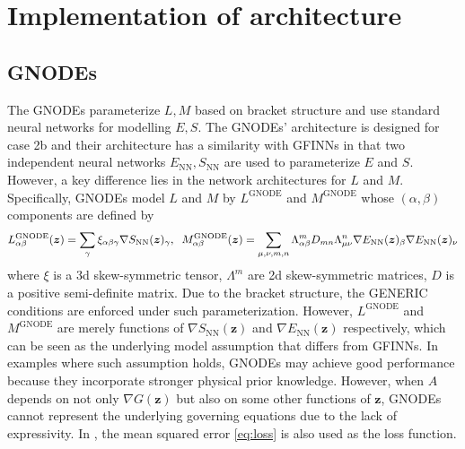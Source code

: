 \documentclass[openacc]{rsproca_new}%
\newcommand{\z}{\bm{z}}
\begin{document}
\appendix
\section{Implementation of architecture} \label{sec:implementation}
\subsection{GNODEs}
The GNODEs \cite{lee2021machine} parameterize $L,M$ 
based on bracket structure and use standard neural networks for modelling $E, S$.
The GNODEs' architecture is designed for case 2b
and their architecture has a similarity with GFINNs in that 
two independent neural networks $E_{\text{NN}}, S_\text{NN}$ are used to parameterize $E$ and $S$.
However, a key difference lies in 
the network architectures for $L$ and $M$.
Specifically, GNODEs model $L$ and $M$ by
$L^{\text{GNODE}}$ and $M^{\text{GNODE}}$
whose $(\alpha,\beta)$ components are defined by
\begin{equation*}
    L_{\alpha\beta}^{\text{GNODE}}(\z) = \sum_{\gamma}\xi_{\alpha\beta\gamma}\nabla S_\text{NN}(\z)_{\gamma}, \hspace{0.2cm}
    M_{\alpha\beta}^{\text{GNODE}}(\z) =\sum_{\mu,\nu,m,n}\Lambda_{\alpha\beta}^mD_{mn}\Lambda_{\mu\nu}^n\nabla E_\text{NN}(\z)_{\beta}\nabla E_\text{NN}(\z)_{\nu}
\end{equation*}
where $\xi$ is a 3d skew-symmetric tensor, $\Lambda^m$ are 2d skew-symmetric matrices, $D$ is a positive semi-definite matrix. 
Due to the bracket structure, the GENERIC conditions are enforced under such parameterization. 
However, $L^{\text{GNODE}}$ and $M^{\text{GNODE}}$ are merely functions of $\nabla S_\text{NN}(\z)$ and $\nabla E_\text{NN}(\z)$ respectively, which can be seen as the underlying model assumption that differs from GFINNs. 
In examples where such assumption holds, GNODEs may achieve good performance
because they incorporate stronger physical prior knowledge. However, when $A$ depends on not only $\nabla G(\z)$ but also on some other functions of $\z$, GNODEs cannot represent the underlying governing equations due to the lack of expressivity. 
In \cite{lee2021machine}, the mean squared error \eqref{eq:loss} is also used as the loss function.
\end{document}
